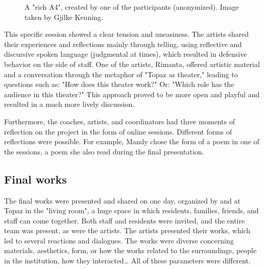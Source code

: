 \documentclass[authordate, empirical]{jote-new-article}
\begin{document}
{\begin{figure}
		\caption{A "rich A4", created by one of the participants (anonymized). Image taken by Gjilke Keuning.}



	\end{figure}













	This specific session showed a clear tension and uneasiness. The artists shared their experiences and reflections mainly through telling, using reflective and discursive spoken language (judgmental at times), which resulted in defensive behavior on the side of staff. One of the artists, Rimanta, offered artistic material and a conversation through the metaphor of "Topaz as theater," leading to questions such as: "How does this theater work?" Or: "Which role has the audience in this theater?" This approach proved to be more open and playful and resulted in a much more lively discussion.







	Furthermore, the coaches, artists, and coordinators had three moments of reflection on the project in the form of online sessions. Different forms of reflections were possible. For example, Mandy chose the form of a poem in one of the sessions, a poem she also read during the final presentation.







	\subsection{Final works}







	The final works were presented and shared on one day, organized by and at Topaz in the "living room", a huge space in which residents, families, friends, and staff can come together. Both staff and residents were invited, and the entire team was present, as were the artists. The artists presented their works, which led to several reactions and dialogues. The works were diverse concerning materials, aesthetics, form, or how the works related to the surroundings, people in the institution, how they interacted… All of these parameters were different.







}
\end{document}
